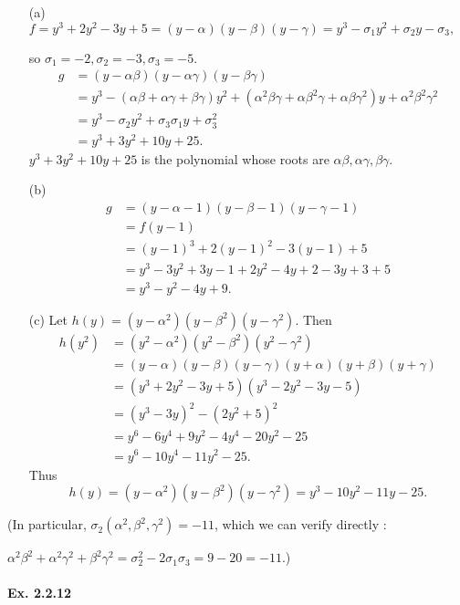 \documentclass[11pt,a4paper]{article}
\begin{document}
\begin{enumerate}
\item[(a)]
$f = y^3+2y^2-3y+5 = (y-\alpha)(y-\beta)(y-\gamma) = y^3-\sigma_1y^2+\sigma_2 y -\sigma_3,$

so
$\sigma_1 = -2, \sigma_2=-3,\sigma_3 = -5.$
\begin{align*}
g&=(y-\alpha\beta)(y-\alpha\gamma)(y-\beta \gamma)\\
&=y^3-(\alpha \beta + \alpha \gamma+\beta \gamma) y^2 + (\alpha^2 \beta \gamma+\alpha \beta^2 \gamma+\alpha \beta \gamma^2) y +\alpha^2\beta^2\gamma^2\\
&=y^3-\sigma_2y^2+\sigma_3\sigma_1 y +\sigma_3^2\\
&=y^3+3y^2+10y+25.
\end{align*}
$y^3+3y^2+10y+25$ is the polynomial whose roots are $\alpha \beta, \alpha \gamma, \beta \gamma$.


\item[(b)]
\begin{align*}
g &=(y - \alpha-1)(y-\beta-1)(y - \gamma-1)\\
 &= f(y-1)\\
&= (y-1)^3+2(y-1)^2-3(y-1)+5\\
&= y^3-3y^2+3y-1+2y^2-4y+2-3y+3+5\\
&=y^3-y^2-4y+9.
\end{align*}


\item[(c)]
Let $h(y) = (y-\alpha^2)(y-\beta^2)(y-\gamma^2)$.
Then
\begin{align*}
h(y^2) &= (y^2-\alpha^2)(y^2 - \beta^2)(y^2-\gamma^2)\\
&=(y-\alpha)(y-\beta)(y-\gamma)(y+\alpha)(y+\beta)(y+\gamma)\\
&=(y^3+2y^2-3y+5)(y^3-2y^2-3y-5)\\
&=(y^3-3y)^2-(2y^2+5)^2\\
&=y^6-6y^4+9y^2 - 4 y^4-20y^2-25\\
&=y^6-10y^4-11y^2-25.
\end{align*}
Thus $$h(y) = (y-\alpha^2)(y-\beta^2)(y-\gamma^2) = y^3-10y^2-11y-25.$$
\end{enumerate}
(In particular, $\sigma_2(\alpha^2,\beta^2,\gamma^2 )= -11$, which we can verify directly :

$\alpha^2\beta^2+\alpha^2\gamma^2+\beta^2\gamma^2 = \sigma_2^2- 2 \sigma_1\sigma_3 = 9-20 = -11$.)

\paragraph{Ex. 2.2.12}
\end{document}
